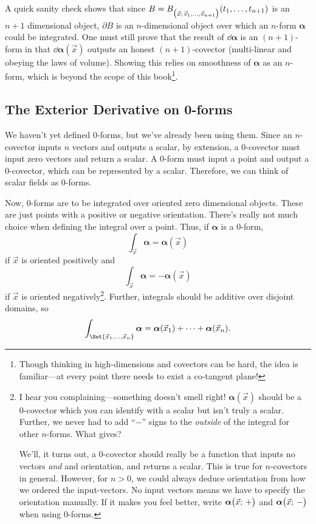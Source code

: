 A quick sanity check shows that since $B = B_{\big(\vec x;\, \vec v_1,\ldots,\vec v_{n+1}\big)}(t_1,\ldots, t_{n+1})$
is an $n+1$ dimensional object, $\partial B$ is an $n$-dimensional object over which an $n$-form $\bm\alpha$ could be
integrated.  One must still prove that the result of $\dd\bm\alpha$ is an $(n+1)$-form
in that $\dd \bm\alpha(\vec x)$ outputs an honest $(n+1)$-covector (multi-linear
and obeying the laws of volume).  Showing this relies on smoothness of $\bm\alpha$
as an $n$-form, which is beyond the scope of this book\footnote{
Though thinking in high-dimensions and covectors can be hard, the
idea is familiar---at every point there needs to exist a co-tangent plane!}.

\subsection{The Exterior Derivative on 0-forms}

We haven't yet defined 0-forms, but we've already been using them.  Since
an $n$-covector inputs $n$ vectors and outputs a scalar, by extension,
a $0$-covector must input zero vectors and return a scalar.  A 0-form
must input a point and output a 0-covector, which can be represented by
a scalar.  Therefore, we can think of scalar fields as 0-forms.

Now, 0-forms are to be integrated over oriented zero dimensional objects.
These are just points with a positive or negative orientation.  There's really not
much choice when defining the integral over a point.  Thus, if $\bm\alpha$
is a 0-form, 
\[
	\int_{\vec x}\bm\alpha = \bm\alpha(\vec x)
\]
if $\vec x$ is oriented positively and 
\[
	\int_{\vec x}\bm\alpha = -\bm\alpha(\vec x)
\]
if $\vec x$ is oriented negatively\footnote{
I hear you complaining---something doesn't smell right!  $\bm\alpha(\vec x)$
should be a 0-covector which you can identify with a scalar but isn't
truly a scalar.  Further, we never had to add ``$-$'' signs to the 
\emph{outside} of the integral for other $n$-forms.  What gives?

We'll, it turns out, a $0$-covector should really be a function
that inputs no vectors \emph{and} and orientation, and returns a scalar.  This is 
true for $n$-covectors in general.  However, for
$n>0$, we could always deduce orientation from how we ordered the input-vectors.  No
input vectors means we have to specify the orientation manually.  If it
makes you feel better, write $\bm\alpha\big(\vec x;\, +\big)$ and $\bm\alpha\big(\vec x;\, -\big)$
when using $0$-forms.
}.  Further, integrals should be additive
over disjoint domains, so
\[
	\int_{\Set{\vec x_1,\ldots,\vec x_n}} \bm\alpha = \bm\alpha(\vec x_1)
	+ \cdots+\bm\alpha(\vec x_n).
\]

